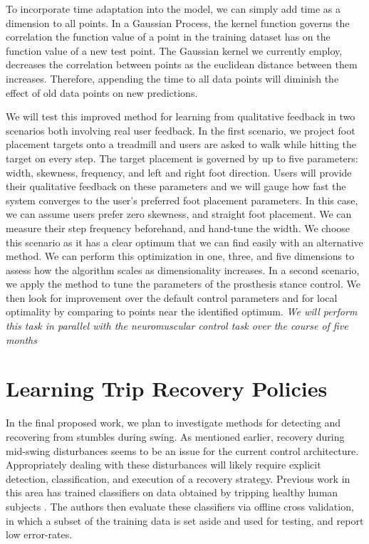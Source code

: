 To incorporate time adaptation into the model, we can simply add time as a
dimension to all points. In a Gaussian Process, the kernel function governs the
correlation the function value of a point in the training dataset has on the
function value of a new test point. The Gaussian kernel we currently employ,
decreases the correlation between points as the euclidean distance between them
increases. Therefore, appending the time to all data points will diminish the
effect of old data points on new predictions.

We will test this improved method for learning from qualitative feedback in two
scenarios both involving real user feedback. In the first scenario, we project
foot placement targets onto a treadmill and users are asked to walk while
hitting the target on every step. The target placement is governed by up to five
parameters: width, skewness, frequency, and left and right foot direction. Users
will provide their qualitative feedback on these parameters and we will gauge
how fast the system converges to the user's preferred foot placement parameters.
In this case, we can assume users prefer zero skewness, and straight foot
placement. We can measure their step frequency beforehand, and hand-tune the
width. We choose this scenario as it has a clear optimum that we can find easily
with an alternative method. We can perform this optimization in one, three, and
five dimensions to assess how the algorithm scales as dimensionality increases.
In a second scenario, we apply the method to tune the parameters of the
prosthesis stance control. We then look for improvement over the default control
parameters and for local optimality by comparing to points near the identified
optimum. \emph{We will perform this task in parallel with the neuromuscular
control task over the course of five months}

\section{Learning Trip Recovery Policies}\label{sec:proposed_trip_class}

In the final proposed work, we plan to investigate methods for detecting and
recovering from stumbles during swing. As mentioned earlier, recovery during
mid-swing disturbances seems to be an issue for the current control
architecture.  Appropriately dealing with these disturbances will likely require
explicit detection, classification, and execution of a recovery strategy.
Previous work in this area has trained classifiers on data obtained by tripping
healthy human subjects \citep{lawson2010stumble, shirota2014recovery}. The
authors then evaluate these classifiers via offline cross validation, in which a
subset of the training data is set aside and used for testing, and report low
error-rates. 

